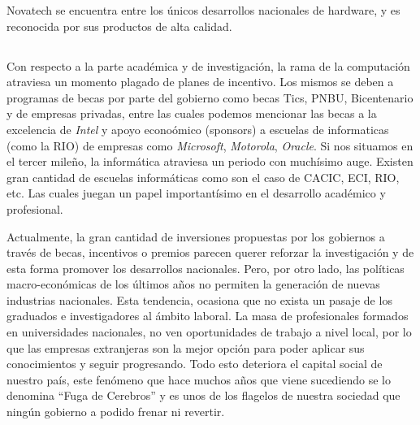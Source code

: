\documentclass[%
 	final,
%
	notitlepage,
	narroweqnarray,
	inline,
 	twoside,
	]{ieee}
\begin{document}
Novatech se encuentra entre los \'unicos desarrollos nacionales de hardware, y es reconocida por sus productos de alta calidad.


\subsection*{}
Con respecto a la parte acad\'emica y de investigaci\'on, la rama de la computaci\'on atraviesa un momento plagado de planes de incentivo. Los mismos se deben a programas de becas por parte del gobierno como becas Tics, PNBU, Bicentenario y de empresas privadas, entre las cuales podemos mencionar las becas a la excelencia de \textit{Intel} y apoyo econo\'omico (sponsors) a escuelas de informaticas (como la RIO) de empresas como \textit{Microsoft}, \textit{Motorola}, \textit{Oracle}.
Si nos situamos en el tercer mile\~no, la inform\'atica atraviesa un periodo con much\'isimo auge. Existen gran cantidad de escuelas informáticas como son el caso de CACIC, ECI, RIO, etc. Las cuales juegan un papel important\'isimo en el desarrollo acad\'emico y profesional.

Actualmente, la gran cantidad de inversiones propuestas por los gobiernos a trav\'es de becas, incentivos o premios parecen querer reforzar la investigaci\'on y de esta forma promover los desarrollos nacionales. Pero, por otro lado, las pol\'iticas macro-econ\'omicas de los \'ultimos a\~nos no permiten la generaci\'on de nuevas industrias nacionales. Esta tendencia, ocasiona que no exista un pasaje de los graduados e investigadores al \'ambito laboral. La masa de profesionales formados en universidades nacionales, no ven oportunidades de trabajo a nivel local, por lo que las empresas extranjeras son la mejor opci\'on para poder aplicar sus conocimientos y seguir progresando. Todo esto deteriora el capital social de nuestro pa\'is, este fen\'omeno que hace muchos a\~nos que viene sucediendo se lo denomina ``Fuga de Cerebros'' y es unos de los flagelos de nuestra sociedad que ning\'un gobierno a podido frenar ni revertir.




\end{document}
